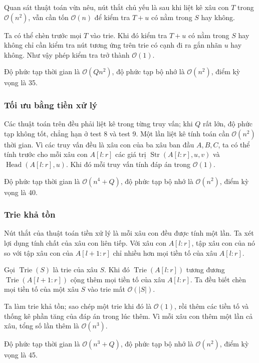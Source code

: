 \documentclass[11pt]{article}
\newcommand{\Oh}{\mathcal{O}}
\begin{document}
Quan sát thuật toán vừa nêu, nút thắt chủ yếu là sau khi liệt kê xâu con \(T\)
trong \(\Oh(n^2)\), vẫn cần tốn \(\Oh(n)\) để kiểm tra \(T+u\) có nằm trong
\(S\) hay không.

Ta có thể chèn trước mọi \(T\) vào trie. Khi đó kiểm tra \(T+u\) có nằm trong
\(S\) hay không chỉ cần kiểm tra nút tương ứng trên trie có cạnh đi ra gắn nhãn
\(u\) hay không. Như vậy phép kiểm tra trở thành \(\Oh(1)\).

Độ phức tạp thời gian là \(\Oh(Qn^2)\), độ phức tạp bộ nhớ là \(\Oh(n^2)\),
điểm kỳ vọng là 35.

\subsubsection{Tối ưu bằng tiền xử lý}

Các thuật toán trên đều phải liệt kê trong từng truy vấn; khi \(Q\) rất lớn,
độ phức tạp không tốt, chẳng hạn ở test 8 và test 9. Một lần liệt kê tính toán
cần \(\Oh(n^2)\) thời gian. Vì các truy vấn đều là xâu con của ba xâu ban đầu
\(A,B,C\), ta có thể tính trước cho mỗi xâu con \(A[l:r]\) các giá trị
\(\operatorname{Str}(A[l:r],u,v)\) và \(\operatorname{Head}(A[l:r],u)\). Khi
đó mỗi truy vấn tính đáp án trong \(\Oh(1)\).

Độ phức tạp thời gian là \(\Oh(n^4+Q)\), độ phức tạp bộ nhớ là \(\Oh(n^2)\),
điểm kỳ vọng là 40.

\subsubsection{Trie khả tồn}

Nút thắt của thuật toán tiền xử lý là mỗi xâu con đều được tính một lần. Ta
xét lợi dụng tính chất của xâu con liên tiếp. Với xâu con \(A[l:r]\), tập xâu
con của nó so với tập xâu con của \(A[l+1:r]\) chỉ nhiều hơn mọi tiền tố của
xâu \(A[l:r]\).

Gọi \(\operatorname{Trie}(S)\) là trie của xâu \(S\). Khi đó
\(\operatorname{Trie}(A[l:r])\) tương đương
\(\operatorname{Trie}(A[l+1:r])\) cộng thêm mọi tiền tố của xâu \(A[l:r]\).
Ta đều biết chèn mọi tiền tố của một xâu \(S\) vào trie mất \(\Oh(|S|)\).

Ta làm trie khả tồn; sao chép một trie khi đó là \(\Oh(1)\), rồi thêm các tiền
tố và thống kê phần tăng của đáp án trong lúc thêm. Vì mỗi xâu con thêm một
lần cả xâu, tổng số lần thêm là \(\Oh(n^3)\).

Độ phức tạp thời gian là \(\Oh(n^3+Q)\), độ phức tạp bộ nhớ là \(\Oh(n^2)\),
điểm kỳ vọng là 45.
\end{document}
